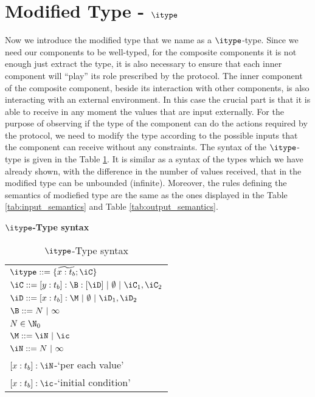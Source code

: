 
\section{Modified Type - $\itype$}

Now we introduce the modified type that we name as a $\itype$-type. Since we need our components to be well-typed, for the composite components it is not enough just extract the type, it is also necessary to ensure that each inner component will ``play'' its role prescribed by the protocol. The inner component of the composite component, beside its interaction with other components, is also interacting with an external environment. In this case the crucial part is that it is able to receive in any moment the values that are input externally. For the purpose of observing if the type of the component can do the actions required by the protocol, we need to modify the type according to the possible inputs that the component can receive without any constraints. The syntax of the $\itype$-type is given in the Table \ref{tab:modsyntax}. It is similar as a syntax of the types which we have already shown, with the difference in the number of values received, that in the modified type can be unbounded (infinite).  Moreover, the rules defining the semantics of modiefied type are the same as the ones displayed in the Table \ref{tab:input_semantics} and Table \ref{tab:output_semantics}.







\textbf{$\itype$-Type syntax}
\vspace{0.5cm}

\begin{table}[H]
\begin{center}
\begin{tabular}{l}
   

$\itype::=\{\widetilde{x:t_b}; \iC \}$\\

$\iC::=[y:t_b]:\B:[\iD] \ |\ \emptyset \ |\ \iC_1,\iC_2$\\

$\iD::=[x:t_b]:\M \ |\ \emptyset \ |\ \iD_1,\iD_2$\\

$\B::=N\ |\  \infty$\\

$N\in\N_0$\\

$\M::=\iN\ |\ \ic$\\

$\iN::= N \ |\  \infty$\\

$[x:t_b]:\iN$-`per each value'\\

$[x:t_b]:\ic$-`initial condition'\\

\end{tabular}
\end{center}
\caption {$\itype$-Type syntax} \label{tab:modsyntax}
\end{table}
\vspace{1cm}

